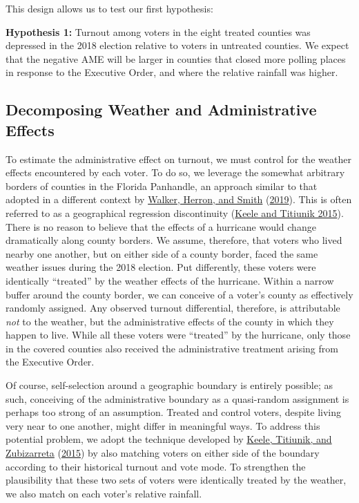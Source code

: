 \documentclass[
  12pt,
]{article}
\begin{document}
This design allows us to test our first hypothesis:

\textbf{Hypothesis 1:} Turnout among voters in the eight treated counties was depressed in the 2018 election relative to voters in untreated counties. We expect that the negative AME will be larger in counties that closed more polling places in response to the Executive Order, and where the relative rainfall was higher.

\hypertarget{decomposing-weather-and-administrative-effects}{%
\subsection*{Decomposing Weather and Administrative Effects}\label{decomposing-weather-and-administrative-effects}}

To estimate the administrative effect on turnout, we must control for the weather effects encountered by each voter. To do so, we leverage the somewhat arbitrary borders of counties in the Florida Panhandle, an approach similar to that adopted in a different context by \protect\hyperlink{ref-Walker2019}{Walker, Herron, and Smith} (\protect\hyperlink{ref-Walker2019}{2019}). This is often referred to as a geographical regression discontinuity (\protect\hyperlink{ref-Keele2015b}{Keele and Titiunik 2015}). There is no reason to believe that the effects of a hurricane would change dramatically along county borders. We assume, therefore, that voters who lived nearby one another, but on either side of a county border, faced the same weather issues during the 2018 election. Put differently, these voters were identically ``treated'' by the weather effects of the hurricane. Within a narrow buffer around the county border, we can conceive of a voter's county as effectively randomly assigned. Any observed turnout differential, therefore, is attributable \emph{not} to the weather, but the administrative effects of the county in which they happen to live. While all these voters were ``treated'' by the hurricane, only those in the covered counties also received the administrative treatment arising from the Executive Order.

Of course, self-selection around a geographic boundary is entirely possible; as such, conceiving of the administrative boundary as a quasi-random assignment is perhaps too strong of an assumption. Treated and control voters, despite living very near to one another, might differ in meaningful ways. To address this potential problem, we adopt the technique developed by \protect\hyperlink{ref-Keele2015a}{Keele, Titiunik, and Zubizarreta} (\protect\hyperlink{ref-Keele2015a}{2015}) by also matching voters on either side of the boundary according to their historical turnout and vote mode. To strengthen the plausibility that these two sets of voters were identically treated by the weather, we also match on each voter's relative rainfall.
\end{document}
